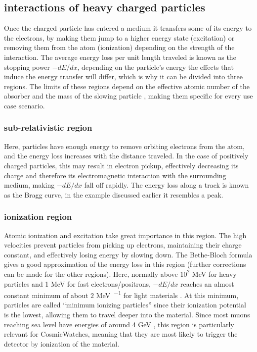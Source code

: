 \subsection{interactions of heavy charged particles}

Once the charged particle has entered a medium it transfers some of its energy to the electrons, by making them jump to a higher energy state (excitation) or removing them from the atom (ionization) depending on the strength of the interaction. The average energy loss per unit length traveled is known as the stopping power $-dE/dx$, depending on the particle's energy the effects that induce the energy transfer will differ, which is why it can be divided into three regions. The limits of these regions depend on the effective atomic number of the absorber and the mass of the slowing particle \cite{ReviewOfParticlePhysics}, making them specific for every use case scenario.

\subsubsection{sub-relativistic region}

Here, particles have enough energy to remove orbiting electrons from the atom, and the energy loss increases with the distance traveled. In the case of positively charged particles, this may result in electron pickup, effectively decreasing its charge and therefore its electromagnetic interaction with the surrounding medium, making $-dE/dx$ fall off rapidly. The energy loss along a track is known as the Bragg curve, in the example discussed earlier it resembles a peak. 

\subsubsection{ionization region}

Atomic ionization and excitation take great importance in this region. The high velocities prevent particles from picking up electrons, maintaining their charge constant, and effectively losing energy by slowing down. The Bethe-Bloch formula gives a good approximation of the energy loss in this region (further corrections can be made for the other regions). Here, normally above $10^2$ MeV for heavy particles and 1 MeV for fast electrons/positrons, $-dE/dx$ reaches an almost constant minimum of about $2$ \unit{\mega\eV\per{\g\cm\squared}} for light materials \cite[p 32]{knoll2010radiation}. At this minimum, particles are called ``minimum ionizing particles'' since their ionization potential is the lowest, allowing them to travel deeper into the material. Since most muons reaching sea level have energies of around 4 \unit{\giga\eV} \cite[p 380]{ReviewOfParticlePhysics}, this region is particularly relevant for CosmicWatches, meaning that they are most likely to trigger the detector by ionization of the material.

